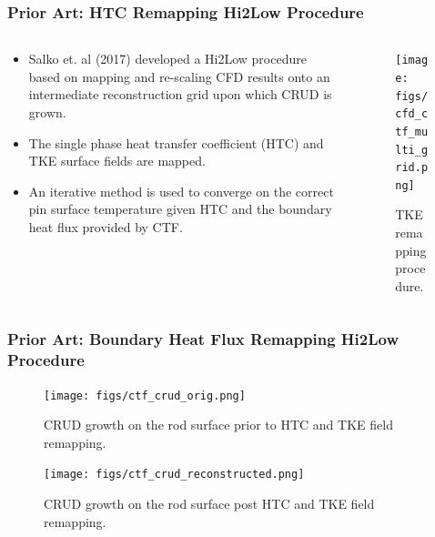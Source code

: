 \documentclass[t, pdftex]{beamer}
\begin{document}
\begin{frame}[shrink=10]
    \frametitle{Prior Art: HTC Remapping Hi2Low Procedure}
\begin{columns}
\begin{column}{0.5\textwidth}
   \begin{itemize}
   \item Salko et. al (2017) developed a Hi2Low procedure based on mapping and re-scaling CFD results onto an intermediate reconstruction grid upon which CRUD is grown.
   \item The single phase heat transfer coefficient (HTC) and TKE surface fields are mapped.
   \item An iterative method is used to converge on the correct pin surface temperature given HTC and the boundary heat flux provided by CTF.
   \end{itemize}
\end{column}
\begin{column}{0.5\textwidth}  %
    \begin{center}
    \begin{figure}
     \texttt{[image: figs/cfd\_ctf\_multi\_grid.png]}
     \caption{TKE remapping procedure.}      
    \end{figure}
     \end{center}
\end{column}
\end{columns}
\end{frame}

\begin{frame}
    \frametitle{Prior Art: Boundary Heat Flux Remapping Hi2Low Procedure}
    \begin{figure}[!htbp]
\centering
\begin{minipage}{.5\textwidth}
  \texttt{[image: figs/ctf\_crud\_orig.png]}
\caption{CRUD growth on the rod surface prior to HTC and TKE field remapping.}
\label{fig:crud_pre_map}
\end{minipage}%
\begin{minipage}{.5\textwidth}
  \texttt{[image: figs/ctf\_crud\_reconstructed.png]}
\caption{CRUD growth on the rod surface post HTC and TKE field remapping.}
\label{fig:crud_post_map}
\end{minipage}
\end{figure}
\end{frame}
\end{document}
